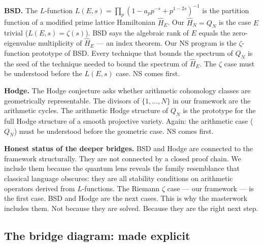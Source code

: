 \documentclass[12pt]{article}
\begin{document}
\medskip
\textbf{BSD.}
The $L$-function $L(E,s) = \prod_p(1-a_pp^{-s}+p^{1-2s})^{-1}$
is the partition function of a modified prime lattice Hamiltonian $\hat{H}_E$.
Our $\hat{H}_N = Q_N$ is the case $E$ trivial ($L(E,s) = \zeta(s)$).
BSD says the algebraic rank of $E$ equals the zero-eigenvalue multiplicity
of $\hat{H}_E$ --- an index theorem.
Our NS program is the $\zeta$-function prototype of BSD.
Every technique that bounds the spectrum of $Q_N$ is the seed
of the technique needed to bound the spectrum of $\hat{H}_E$.
The $\zeta$ case must be understood before the $L(E,s)$ case.
NS comes first.

\medskip
\textbf{Hodge.}
The Hodge conjecture asks whether arithmetic cohomology classes
are geometrically representable.
The divisors of $\{1,\ldots,N\}$ in our framework are the arithmetic cycles.
The arithmetic Hodge structure of $Q_N$ is the prototype
for the full Hodge structure of a smooth projective variety.
Again: the arithmetic case ($Q_N$) must be understood before
the geometric case.
NS comes first.

\begin{tcolorbox}[warnbox]
\textbf{Honest status of the deeper bridges.}
BSD and Hodge are connected to the framework structurally.
They are not connected by a closed proof chain.
We include them because the quantum lens reveals the family resemblance
that classical language obscures: they are all stability conditions
on arithmetic operators derived from $L$-functions.
The Riemann $\zeta$ case --- our framework --- is the first case.
BSD and Hodge are the next cases.
This is why the masterwork includes them.
Not because they are solved. Because they are the right next step.
\end{tcolorbox}

\subsection{The bridge diagram: made explicit}
\label{sec:bridge-diagram}
\end{document}
